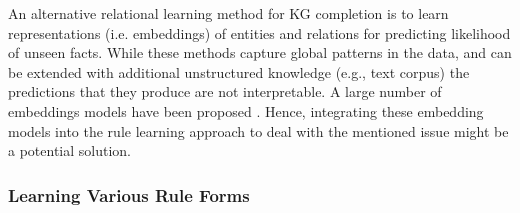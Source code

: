An alternative relational learning method for KG completion is to learn representations (i.e. embeddings) of entities and relations for predicting likelihood of unseen facts. While these methods capture global patterns in the data, and can be extended with additional unstructured knowledge (e.g., text corpus) the predictions that they produce are not interpretable. A large number of embeddings models have been proposed \cite{8047276}. Hence, integrating these embedding models into the rule learning approach to deal with the mentioned issue might be a potential solution.

\subsubsection{Learning Various Rule Forms}

